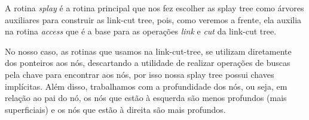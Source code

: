 A rotina \textit{splay} é a rotina principal que nos fez escolher as splay tree como árvores auxiliares para construir as link-cut tree, pois, como veremos a frente, ela auxilia na rotina \textit{access} que é a base para as operações \textit{link} e \textit{cut} da link-cut tree.  

No nosso caso, as rotinas que usamos na link-cut-tree, se utilizam diretamente dos ponteiros aos nós, descartando a utilidade de realizar operações de buscas pela chave para encontrar aos nós, por isso nossa splay tree possui chaves implícitas. Além disso, trabalhamos com a profundidade dos nós, ou seja, em relação ao pai do nó, os nós que estão à esquerda são menos profundos (mais superficiais) e os nós que estão à direita são mais profundos.  

